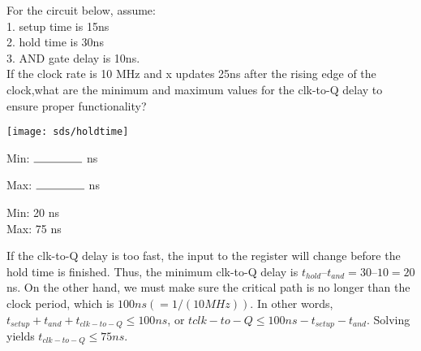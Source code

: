 \begin{blocksection}
For the circuit below, assume: \\
    1. setup time is 15ns \\
    2. hold time is 30ns \\
    3. AND gate delay is 10ns.  \\
If the clock rate is 10 MHz and x updates 25ns after the rising edge of the clock,what are the minimum and maximum values for the clk-to-Q delay to ensure proper functionality?
    
\texttt{[image: sds/holdtime]}

\item Min: $\rule{1.5cm}{0.15mm}$ ns
\item Max: $\rule{1.5cm}{0.15mm}$ ns

\begin{solution} 
Min: 20 ns \\
Max: 75 ns

If the clk-to-Q delay is too fast, the input to the register will change before the hold time is finished.
Thus, the minimum clk-to-Q delay is $t_{hold} – t_{and} = 30 – 10 = 20$ ns.
On the other hand, we must make sure the critical path is no longer than the clock period, which is $100 ns (= 1/(10 MHz))$. 
In other words, $t_{setup} + t_{and} + t_{clk-to-Q} \leq 100ns$, or $tclk-to-Q \leq 100ns - t_{setup} - t_{and}$. Solving yields $t_{clk-to-Q} \leq 75 ns$.
    
\end{solution}
    
\end{blocksection}